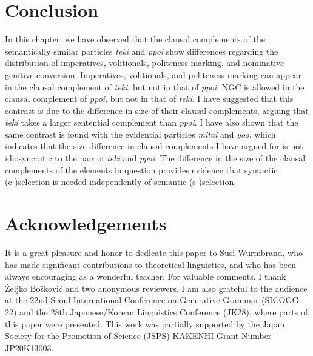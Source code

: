 \documentclass[output=paper]{langscibook}
\begin{document}
\section{Conclusion} \label{saitos5}
In this chapter, we have observed that the clausal complements of the semantically similar particles \emph{teki} and \emph{ppoi} show differences regarding the distribution of imperatives, volitionals, politeness marking, and nominative genitive conversion. Imperatives, volitionals, and politeness marking can appear in the clausal complement of \emph{teki}, but not in that of \emph{ppoi}. NGC is allowed in the clausal complement of \emph{ppoi}, but not in that of \emph{teki}. I have suggested that this contrast is due to the difference in size of their clausal complements, arguing that \emph{teki} takes a larger sentential complement than \emph{ppoi}. I have also shown that the same contrast is found with the evidential particles \emph{mitai} and \emph{yoo}, which indicates that the size difference in clausal complements I have argued for is not idiosyncratic to the pair of \emph{teki} and \emph{ppoi}. The difference in the size of the clausal complements of the elements in question provides evidence that syntactic (c-)selection is needed independently of semantic (s-)selection.

\begin{comment}
\section*{Abbreviations}
\begin{tabularx}{.45\textwidth}{lQ}
... & \\
... & \\
\end{tabularx}
\begin{tabularx}{.45\textwidth}{lQ}
... & \\
... & \\
\end{tabularx}
\end{comment}

\section*{Acknowledgements}
It is a great pleasure and honor to dedicate this paper to Susi Wurmbrand, who has made significant contributions to theoretical linguistics, and who has been always encouraging as a wonderful teacher. For valuable comments, I thank Željko Bošković and two anonymous reviewers. I am also grateful to the audience at the 22nd Seoul International Conference on Generative Grammar (SICOGG 22) and the 28th Japanese/Korean Linguistics Conference (JK28), where parts of this paper were presented. This work was partially supported by the Japan Society for the Promotion of Science (JSPS) KAKENHI Grant Number JP20K13003.

\printbibliography[heading=subbibliography,notkeyword=this]
\end{document}
